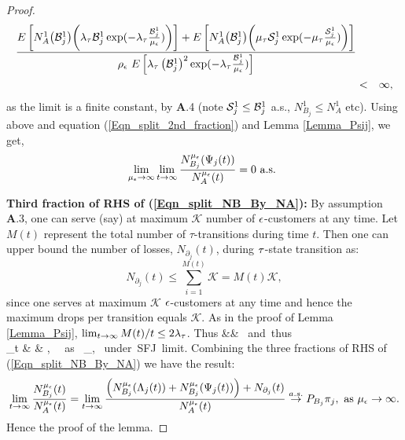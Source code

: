 \begin{proof}
\begin{eqnarray*}
	\frac{E \left[ N^1_A \big(  \mathcal{B}_j^1\big) \bigg(  \lambda_\tau \mathcal B_j^1 \exp( - \lambda_\tau  \frac{\mathcal B_j^1}{\mu_\epsilon}) \bigg) \right] + E \left[  N^1_A \big( \mathcal{B}_j^1\big) \bigg( \mu_\tau \S_j^1 \exp( - \mu_\tau  \frac{\S_j^1}{\mu_\epsilon}) \bigg)  \right]}{ \rho_\epsilon \ E \left[ \lambda_\tau \left (\mathcal B_j^1 \right )^2 \exp( - \lambda_\tau  \frac{\mathcal B_j^1}{\mu_\epsilon}) \right]}\\
	&< & \infty,  
\end{eqnarray*}as the limit is  a finite constant, by {\bf A}.4 (note $\S_j^1 \le \mathcal{B}_j^1$ a.s., $ N^1_{B_j}  \le N^1_A$ etc).
Using above and equation (\ref{Eqn_split_2nd_fraction}) and Lemma \ref{Lemma_Psij}, we get,
\begin{eqnarray}
\lim_{\mu_\epsilon \to \infty} \lim_{t \to \infty} \frac{N_{B_j}^{\mue}( \Psi_{j} (t))}{N_A^{\mue}(t)} =  0 \mbox{ a.s. }
\end{eqnarray}

{\bf Third fraction of RHS of (\ref{Eqn_split_NB_By_NA}):} By assumption {\bf A}.3, one can serve (say) at maximum $\mathcal{ K}$
number of $\i$-customers at any time. Let $M(t)$ represent the total number of $\tau$-transitions during time $t$. Then one can upper bound the number of losses, $N_{\partial_j} (t)$, during $\t$-state transition  as: 
$$
N_{\partial_j} (t) \le  \sum^{M(t)}_{i=1} \mathcal{ K} = M(t) \mathcal{ K},
$$since one serves at maximum $\mathcal{ K} $ $\i$-customers at any time and hence the maximum drops per transition equals $\mathcal{ K}$.  As in the proof of Lemma \ref{Lemma_Psij},  $\lim_{t \to \infty } M(t) / t  \le 2\lambda_\t $. 
Thus 
\beq
{}  &\le&        \mbox{ and thus } \\
\lim_{t \to \infty}   & \le &    , \  \mbox{ as } \mu_\epsilon \to \infty, \mbox{ under SFJ limit}. 
\eeq
Combining the three fractions of  RHS of (\ref{Eqn_split_NB_By_NA}) we have the result:  $$
 \lim _{t \to \infty } \frac{N_{B_j}^{\mue}(t)}{N_A^{\mue}(t)} = \lim _{t \to \infty } \frac{ \left( N_{B_j}^{\mue}(\Lambda_{j}(t)) + N_{B_j}^{\mue}( \Psi_{j} (t)) \right) + N_{\partial_j} (t) }{N_A^{\mue}(t)}   \convas P_{B_j}  \pi_{j},  \mbox{ as } \mu_\epsilon \to \infty. 
$$
Hence the proof of the lemma.
	
\end{proof}





